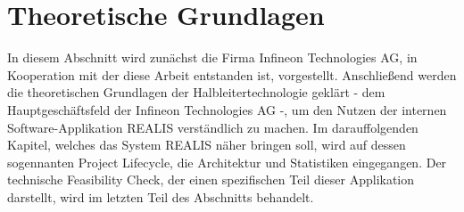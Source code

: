 \chapter{Theoretische Grundlagen}\label{Chap:TheoretischeGrundlagen}
In diesem Abschnitt wird zunächst die Firma Infineon Technologies AG, in Kooperation mit der diese Arbeit entstanden ist, vorgestellt. Anschließend werden die theoretischen Grundlagen der Halbleitertechnologie geklärt - dem Hauptgeschäftsfeld der Infineon Technologies AG -, um den Nutzen der internen Software-Applikation \gls{REALIS} verständlich zu machen. Im darauffolgenden Kapitel, welches das System \gls{REALIS} näher bringen soll, wird auf dessen sogennanten Project Lifecycle, die Architektur und Statistiken eingegangen. Der technische Feasibility Check, der einen spezifischen Teil dieser Applikation darstellt, wird im letzten Teil des Abschnitts behandelt.




